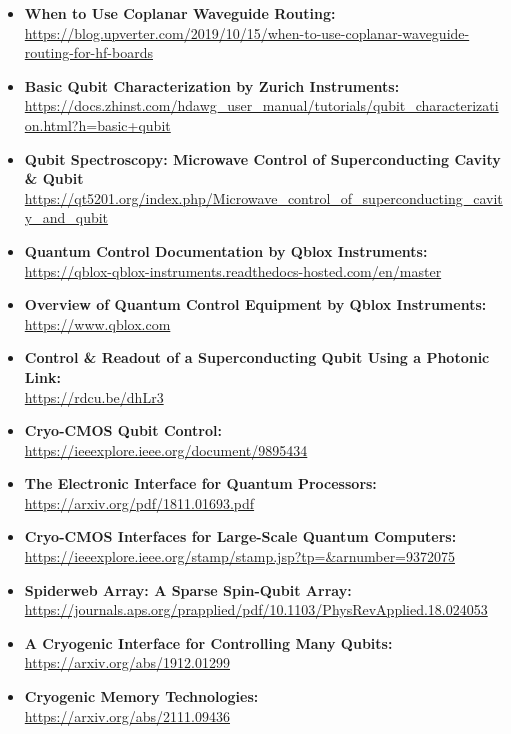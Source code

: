 \begin{itemize}
  \item\textbf{When to Use Coplanar Waveguide Routing:}\\
\url{https://blog.upverter.com/2019/10/15/when-to-use-coplanar-waveguide-routing-for-hf-boards}

  \item\textbf{Basic Qubit Characterization by Zurich Instruments:}\\
\url{https://docs.zhinst.com/hdawg_user_manual/tutorials/qubit_characterization.html?h=basic+qubit}

  \item\textbf{Qubit Spectroscopy: Microwave Control of Superconducting Cavity \& Qubit}\\
\url{https://qt5201.org/index.php/Microwave_control_of_superconducting_cavity_and_qubit}

  \item\textbf{Quantum Control Documentation by Qblox Instruments:}\\
\url{https://qblox-qblox-instruments.readthedocs-hosted.com/en/master}

  \item\textbf{Overview of Quantum Control Equipment by Qblox Instruments:}\\
\url{https://www.qblox.com}

  \item\textbf{Control \& Readout of a Superconducting Qubit Using a Photonic Link:}\\
\url{https://rdcu.be/dhLr3}

  \item\textbf{Cryo-CMOS Qubit Control:}\\
\url{https://ieeexplore.ieee.org/document/9895434}

  \item\textbf{The Electronic Interface for Quantum Processors:}\\
\url{https://arxiv.org/pdf/1811.01693.pdf}

  \item\textbf{Cryo-CMOS Interfaces for Large-Scale Quantum Computers:}\\
\url{https://ieeexplore.ieee.org/stamp/stamp.jsp?tp=&arnumber=9372075}

  \item\textbf{Spiderweb Array: A Sparse Spin-Qubit Array:}\\
\url{https://journals.aps.org/prapplied/pdf/10.1103/PhysRevApplied.18.024053 }

  \item\textbf{A Cryogenic Interface for Controlling Many Qubits:}\\
\url{https://arxiv.org/abs/1912.01299}

  \item\textbf{Cryogenic Memory Technologies:}\\
\url{https://arxiv.org/abs/2111.09436}

\end{itemize}


